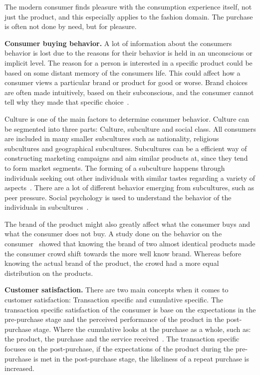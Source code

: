 The modern consumer finds pleasure with the consumption experience itself, not just the product, and this especially applies to the fashion domain.
The purchase is often not done by need, but for pleasure.

\textbf{Consumer buying behavior.}
A lot of information about the consumers behavior is lost due to the reasons for their behavior is held in an unconscious or implicit level.
The reason for a person is interested in a specific product could be based on some distant memory of the consumers life.
This could affect how a consumer views a particular brand or product for good or worse.
Brand choices are often made intuitively, based on their subconscious, and the consumer cannot tell why they made that specific choice~\cite{vignali2009fashion}.

Culture is one of the main factors to determine consumer behavior.
Culture can be segmented into three parts: Culture, subculture and social class.
All consumers are included in many smaller subcultures such as nationality, religious subcultures and geographical subcultures.
Subcultures can be a efficient way of constructing marketing campaigns and aim similar products at, since they tend to form market segments.
The forming of a subculture happens through individuals seeking out other individuals with similar tastes regarding a variety of aspects~\cite{vignali2009fashion}.
There are a lot of different behavior emerging from subcultures, such as peer pressure.
Social psychology is used to understand the behavior of the individuals in subcultures~\cite{vignali2009fashion}.

The brand of the product might also greatly affect what the consumer buys and what the consumer does not buy.
A study done on the behavior on the consumer~\cite{deLace2011} showed that knowing the brand of two almost identical products made the consumer crowd shift towards the more well know brand.
Whereas before knowing the actual brand of the product, the crowd had a more equal distribution on the products.

\textbf{Customer satisfaction.}
There are two main concepts when it comes to customer satisfaction:
Transaction specific and cumulative specific.
The transaction specific satisfaction of the consumer is base on the expectations in the pre-purchase stage and the perceived performance of the product in the post-purchase stage.
Where the cumulative looks at the purchase as a whole, such as: the product, the purchase and the service received~\cite{kumari2012}.
The transaction specific focuses on the post-purchase, if the expectations of the product during the pre-purchase is met in the post-purchase stage, the likeliness of a repeat purchase is increased.

